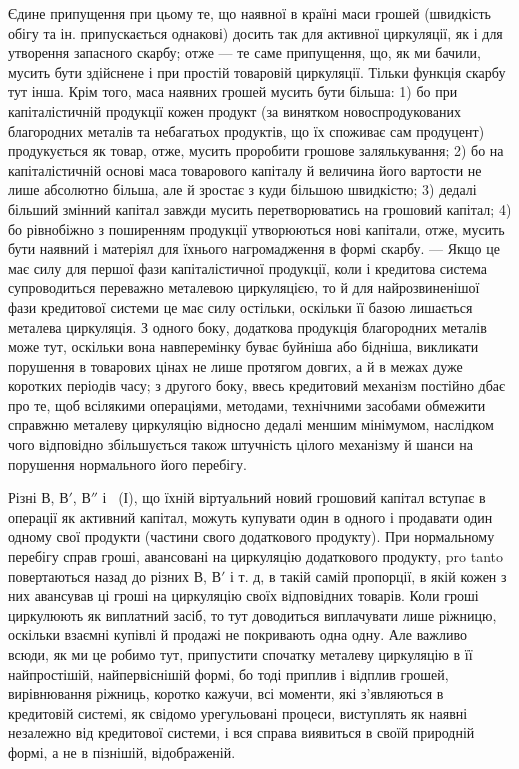 Єдине припущення при цьому те, що наявної в країні маси грошей
(швидкість обігу та ін. припускається однакові) досить так для активної
циркуляції, як і для утворення запасного скарбу; отже — те саме припущення,
що, як ми бачили, мусить бути здійснене і при простій товаровій
циркуляції. Тільки функція скарбу тут інша. Крім того, маса наявних
грошей мусить бути більша: 1) бо при капіталістичній продукції
кожен продукт (за винятком новоспродукованих благородних металів та
небагатьох продуктів, що їх споживає сам продуцент) продукується як
товар, отже, мусить проробити грошове залялькування; 2) бо на капіталістичній
основі маса товарового капіталу й величина його вартости не
лише абсолютно більша, але й зростає з куди більшою швидкістю;
3) дедалі більший змінний капітал завжди мусить перетворюватись на
грошовий капітал; 4) бо рівнобіжно з поширенням продукції утворюються
нові капітали, отже, мусить бути наявний і матеріял для їхнього нагромадження
в формі скарбу. — Якщо це має силу для першої фази капіталістичної
продукції, коли і кредитова система супроводиться переважно
металевою циркуляцією, то й для найрозвиненішої фази кредитової
системи це має силу остільки, оскільки її базою лишається металева
циркуляція. З одного боку, додаткова продукція благородних металів
може тут, оскільки вона навперемінку буває буйніша або бідніша,
викликати порушення в товарових цінах не лише протягом довгих, а й
в межах дуже коротких періодів часу; з другого боку, ввесь кредитовий
механізм постійно дбає про те, щоб всілякими операціями, методами,
технічними засобами обмежити справжню металеву циркуляцію відносно
дедалі меншим мінімумом, наслідком чого відповідно збільшується також
штучність цілого механізму й шанси на порушення нормального його
перебігу.

Різні $В$, $В'$, $В''$ і~ (І), що їхній віртуальний новий грошовий
капітал вступає в операції як активний капітал, можуть купувати один в одного
і продавати один одному свої продукти (частини свого додаткового
продукту). При нормальному перебігу справ гроші, авансовані на циркуляцію
додаткового продукту, pro tanto повертаються назад до різних
$В$, $В'$ і т. д, в такій самій пропорції, в якій кожен з них авансував
ці гроші на циркуляцію своїх відповідних товарів. Коли гроші циркулюють
як виплатний засіб, то тут доводиться виплачувати лише ріжницю,
оскільки взаємні купівлі й продажі не покривають одна одну. Але важливо
всюди, як ми це робимо тут, припустити спочатку металеву циркуляцію
в її найпростішій, найпервіснішій формі, бо тоді приплив
і відплив грошей, вирівнювання ріжниць, коротко кажучи, всі моменти,
які з’являються в кредитовій системі, як свідомо урегульовані
процеси, виступлять як наявні незалежно від кредитової системи, і
вся справа виявиться в своїй природній формі, а не в пізнішій,
відображеній.

